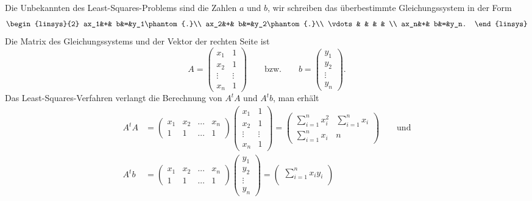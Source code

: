 \begin{loesung}
Die Unbekannten des Least-Squares-Problems sind die Zahlen $a$ und $b$,
wir schreiben das überbestimmte Gleichungssystem in der Form
\[
\begin{linsys}{2}
  ax_1&+&     b&=&y_1\phantom{.}\\
  ax_2&+&     b&=&y_2\phantom{.}\\
\vdots& &      & &   \\
  ax_n&+&     b&=&y_n.
\end{linsys}
\]
Die Matrix des Gleichungssystems und der Vektor der rechten Seite ist 
\[
A=
\begin{pmatrix}
x_1&1\\
x_2&1\\
\vdots&\vdots\\
x_n&1
\end{pmatrix}
\qquad
\text{bzw.}
\qquad
b=\begin{pmatrix}
y_1\\
y_2\\
\vdots\\
y_n
\end{pmatrix}.
\]
Das Least-Squares-Verfahren verlangt die Berechnung von $A^tA$ und $A^tb$,
man erhält
\[
\begin{aligned}
A^tA
&=\begin{pmatrix}
x_1&x_2&\dots&x_n\\
  1&  1&\dots&1
\end{pmatrix}
\begin{pmatrix}
x_1&1\\
x_2&1\\
\vdots&\vdots\\
x_n&1
\end{pmatrix}
=
\begin{pmatrix}
\displaystyle \sum_{i=1}^nx_i^2& \displaystyle \sum_{i=1}^nx_i\\
\displaystyle \sum_{i=1}^nx_i  & n
\end{pmatrix}
\qquad\text{und}
\\
A^tb
&=\begin{pmatrix}
x_1&x_2&\dots&x_n\\
  1&  1&\dots&1
\end{pmatrix}
\begin{pmatrix}
y_1\\
y_2\\
\vdots\\
y_n
\end{pmatrix}
=\begin{pmatrix}
\displaystyle \sum_{i=1}^n x_iy_i\\

\end{pmatrix}
\end{aligned}\]
\end{loesung}
